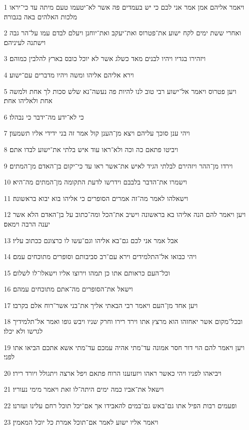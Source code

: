 \par 1 ויאמר אליהם אמן אמר אני לכם כי יש בעמדים פה אשר לא־יטעמו טעם מיתה עד כי־יראו מלכות האלהים באה בגבורה׃
\par 2 ואחרי ששת ימים לקח ישוע את־פטרוס ואת־יעקב ואת־יוחנן ויעלם לבדם עמו על־הר גבה וישתנה לעיניהם׃
\par 3 ויזהירו בגדיו ויהיו לבנים מאד כשלג אשר לא יוכל כובס בארץ להלבין כמוהם׃
\par 4 וירא אליהם אליהו ומשה ויהיו מדברים עם־ישוע׃
\par 5 ויען פטרוס ויאמר אל־ישוע רבי טוב לנו להיות פה נעשה־נא שלש סכות לך אחת ולמשה אחת ולאליהו אחת׃
\par 6 כי לא־ידע מה־ידבר כי נבהלו׃
\par 7 ויהי ענן סוכך עליהם ויצא מן־הענן קול אמר זה בני ידידי אליו תשמעון׃
\par 8 ויביטו פתאם כה וכה ולא־ראו עוד איש בלתי את־ישוע לבדו אתם׃
\par 9 וירדו מן־ההר ויזהירם לבלתי הגיד לאיש את־אשר ראו עד כי־יקום בן־האדם מן־המתים׃
\par 10 וישמרו את־הדבר בלבבם וידרשו לדעת התקומה מן־המתים מה־היא׃
\par 11 וישאלהו לאמר מה־זה אמרים הסופרים כי אליהו בוא יבוא בראשונה׃
\par 12 ויען ויאמר להם הנה אליהו בא בראשונה וישיב את־הכל ומה־כתוב על בן־האדם הלא אשר יענה הרבה וימאס׃
\par 13 אבל אמר אני לכם גם־בא אליהו וגם־עשו לו כרצונם ככתוב עליו׃
\par 14 ויהי כבואו אל־התלמידים וירא עם־רב סביבותם וסופרים מתוכחים עמם׃
\par 15 וכל־העם כראותם אתו כן תמהו וירוצו אליו וישאלו־לו לשלום׃
\par 16 וישאל את־הסופרים מה־אתם מתוכחים עמהם׃
\par 17 ויען אחד מן־העם ויאמר רבי הבאתי אליך את־בני אשר־רוח אלם בקרבו׃
\par 18 ובכל־מקום אשר יאחזהו הוא מרצץ אתו וירד רירו וחרק שניו ויבש גופו ואמר אל־תלמידיך לגרשו ולא יכלו׃
\par 19 ויען ויאמר להם הוי דור חסר אמונה עד־מתי אהיה עמכם עד־מתי אשא אתכם הביאו אתו לפני׃
\par 20 ויביאהו לפניו ויהי כאשר ראהו ויזעזענו הרוח פתאם ויפל ארצה ויתגולל ויורד רירו׃
\par 21 וישאל את־אביו כמה ימים היתה־לו זאת ויאמר מימי נעוריו׃
\par 22 ופעמים רבות הפיל אתו גם־באש גם־במים להאבידו אך אם־יכל תוכל רחם עלינו ועזרנו׃
\par 23 ויאמר אליו ישוע לאמר אם־תוכל אמרת כל יוכל המאמין׃

